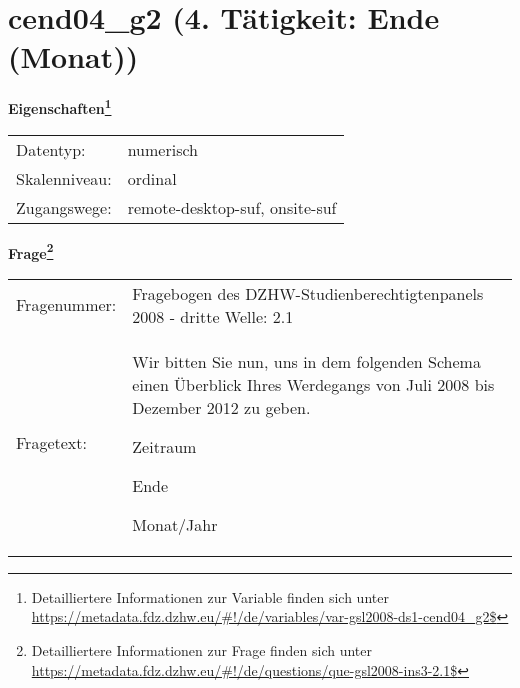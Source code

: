 
    \setcounter{footnote}{0}

    \vspace*{-1.8cm}
	\section{cend04\_g2 (4. Tätigkeit: Ende (Monat))}
	\label{section:cend04_g2}



    \vspace*{0.5cm}
    \noindent\textbf{Eigenschaften\footnote{Detailliertere Informationen zur Variable finden sich unter
		\url{https://metadata.fdz.dzhw.eu/\#!/de/variables/var-gsl2008-ds1-cend04_g2$}}}\\
	\begin{tabularx}{\hsize}{@{}lX}
	Datentyp: & numerisch \\
	Skalenniveau: & ordinal \\
	Zugangswege: &
	  remote-desktop-suf, 
	  onsite-suf
 \\
    \end{tabularx}



				\vspace*{0.5cm}
                \noindent\textbf{Frage\footnote{Detailliertere Informationen zur Frage finden sich unter
		              \url{https://metadata.fdz.dzhw.eu/\#!/de/questions/que-gsl2008-ins3-2.1$}}}\\
				\begin{tabularx}{\hsize}{@{}lX}
					Fragenummer: &
					  Fragebogen des DZHW-Studienberechtigtenpanels 2008 - dritte Welle:
					  2.1
 \\
					Fragetext: & Wir bitten Sie nun, uns in dem folgenden Schema einen Überblick Ihres Werdegangs von Juli 2008 bis Dezember 2012 zu geben.\par  Zeitraum\par  Ende\par  Monat/Jahr \\
				\end{tabularx}





